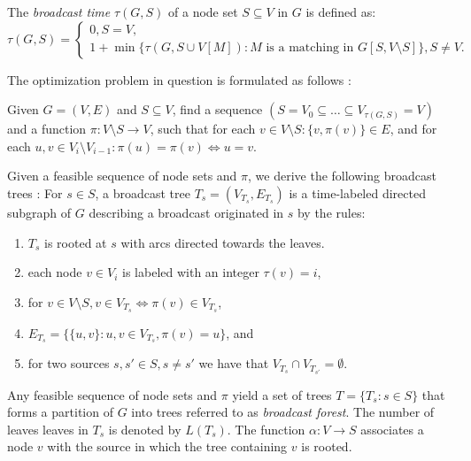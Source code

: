 \begin{definition}
The \emph{broadcast time} $\tau(G,S)$ of a node set $S\subseteq V$ in $G$ is defined as: 
\begin{equation*}
\tau(G,S)=
\begin{cases}
	0, S=V,\\
	1+\min\{\tau(G,S\cup V\left[M\right]):M \text{ is a matching in } G\left[S, V\setminus S\right]\}, S\neq V.
\end{cases}
\label{eq:btime}
\end{equation*}
\end{definition}
The optimization problem in question is formulated as follows \cite{jansen95,middendorf93}:
\begin{problem}\label{prob:min}
Given $G=(V,E)$ and $S\subseteq V$, find a sequence $(S=V_0\subseteq\dots\subseteq V_{\tau(G,S)}=V)$ and a function $\pi:V\setminus S\to V$, such that for each $v\in V\setminus S:\{v,\pi(v)\}\in E$, and for each $u,v\in V_i\setminus V_{i-1}: \pi(u)=\pi(v)\Leftrightarrow u=v$.
\end{problem}

Given a feasible sequence of node sets and $\pi$, we derive the following broadcast trees \cite{grigni91}:
For $s\in S$, a broadcast tree $T_s=(V_{T_s},E_{T_s})$ is a time-labeled directed subgraph of $G$ describing a broadcast originated in $s$ by the rules:
\begin{enumerate}
\item $T_s$ is rooted at $s$ with arcs directed towards the leaves.
\item each node $v\in V_i$ is labeled with an integer $\tau(v)=i$,
\item for $v\in V\setminus S, v\in V_{T_s}\Leftrightarrow \pi(v)\in V_{T_s}$, 
\item $E_{T_s}=\{\{u,v\}: u,v\in V_{T_s}, \pi(v)=u\}$, and
\item for two sources $s,s'\in S, s\neq s'$ we have that $V_{T_s}\cap V_{T_{s'}}=\emptyset$. 
\end{enumerate}

Any feasible sequence of node sets and $\pi$ yield a set of trees $T=\{T_s:s\in S\}$ that forms a partition of $G$ into trees referred to as \emph{broadcast forest}.
The number of leaves leaves in $T_s$ is denoted by $L(T_s)$.
The function $\alpha:V\to S$ associates a node $v$ with the source in which the tree containing $v$ is rooted.

